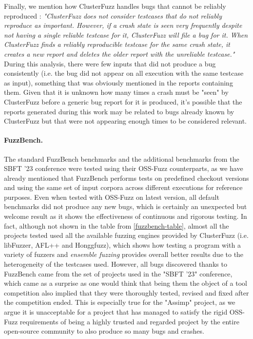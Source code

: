 Finally, we mention how ClusterFuzz handles bugs that cannot be reliably reproduced \cite{unreliable}: \textit{"ClusterFuzz does not consider testcases that do not reliably reproduce as important. However, if a crash state is seen very frequently despite not having a single reliable testcase for it, ClusterFuzz will file a bug for it. When ClusterFuzz finds a reliably reproducible testcase for the same crash state, it creates a new report and deletes the older report with the unreliable testcase."} During this analysis, there were few inputs that did not produce a bug consistently (i.e. the bug did not appear on all execution with the same testcase as input), something that was obviously mentioned in the reports containing them. Given that it is unknown how many times a crash must be "seen" by ClusterFuzz before a generic bug report for it is produced, it's possible that the reports generated during this work may be related to bugs already known by ClusterFuzz but that were not appearing enough times to be considered relevant.


\paragraph{FuzzBench.} The standard FuzzBench benchmarks and the additional benchmarks from the SBFT '23 conference were tested using their OSS-Fuzz counterparts, as we have already mentioned that FuzzBench performs tests on predefined checkout versions and using the same set of input corpora across different executions for reference purposes. Even when tested with OSS-Fuzz on latest version, all default benchmarks did not produce any new bugs, which is certainly an unexpected but welcome result as it shows the effectiveness of continuous and rigorous testing. In fact, although not shown in the table from \ref{fuzzbench-table}, almost all the projects tested used all the available fuzzing engines provided by ClusterFuzz (i.e. libFuzzer, AFL++ and Honggfuzz), which shows how testing a program with a variety of fuzzers and \textit{ensemble fuzzing} provides overall better results due to the heterogeneity of the testcases used. However, all bugs discovered thanks to FuzzBench came from the set of projects used in the "SBFT '23" conference, which came as a surprise as one would think that being them the object of a tool competition also implied that they were thoroughly tested, revised and fixed after the competition ended. This is especially true for the "Assimp" project, as we argue it is unacceptable for a project that has managed to satisfy the rigid OSS-Fuzz requirements of being a highly trusted and regarded project by the entire open-source community to also produce so many bugs and crashes.

